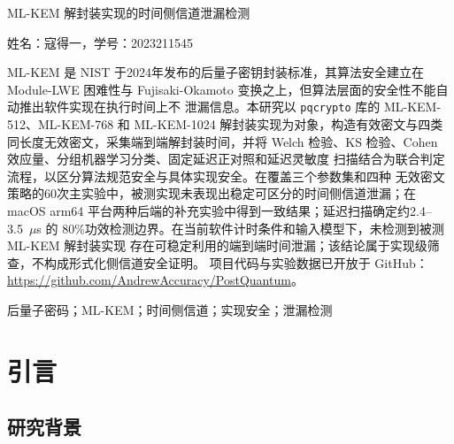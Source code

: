 \documentclass[a4paper,fontset=none]{ctexart}
\begin{document}


\thispagestyle{empty}
\begin{center}
  {\paperhei{} ML-KEM 解封装实现的时间侧信道泄漏检测\par}
  \vspace{0.85em}
  {\paperkai{} 姓名：寇得一，学号：2023211545\par}
\end{center}
\vspace{1.2em}
\begin{center}
\begin{minipage}{0.84\textwidth}
{\paperkai{}\selectfont
{}ML-KEM 是 NIST
于2024年发布的后量子密钥封装标准，其算法安全建立在 Module-LWE 困难性与
Fujisaki-Okamoto 变换之上，但算法层面的安全性不能自动推出软件实现在执行时间上不
泄漏信息。本研究以 \texttt{pqcrypto} 库的 ML-KEM-512、ML-KEM-768 和 ML-KEM-1024
解封装实现为对象，构造有效密文与四类同长度无效密文，采集端到端解封装时间，并将
Welch 检验、KS 检验、Cohen 效应量、分组机器学习分类、固定延迟正对照和延迟灵敏度
扫描结合为联合判定流程，以区分算法规范安全与具体实现安全。在覆盖三个参数集和四种
无效密文策略的60次主实验中，被测实现未表现出稳定可区分的时间侧信道泄漏；在 macOS
arm64 平台两种后端的补充实验中得到一致结果；延迟扫描确定约2.4--3.5~$\mu$s 的
80\%功效检测边界。在当前软件计时条件和输入模型下，未检测到被测 ML-KEM 解封装实现
存在可稳定利用的端到端时间泄漏；该结论属于实现级筛查，不构成形式化侧信道安全证明。
项目代码与实验数据已开放于 GitHub：
\href{https://github.com/AndrewAccuracy/PostQuantum}{https://github.com/AndrewAccuracy/PostQuantum}。

\vspace{0.8em}
后量子密码；ML-KEM；时间侧信道；实现安全；泄漏检测
\par}
\end{minipage}
\end{center}


\section{引言}
\label{sec:intro}

\subsection{研究背景}
\end{document}
